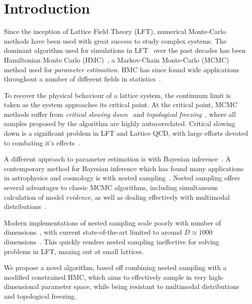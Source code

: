 \documentclass[11pt]{article}
\begin{document}
    \section{Introduction}\label{Introduction}
    Since the inception of Lattice Field Theory (LFT), numerical Monte-Carlo methods have been used with great success to
    study complex systems.
    The dominant algorithm used for simulations in LFT~\cite{borsanyi2021leading} over the past decades has been
    Hamiltonian Monte Carlo
    (HMC)~\cite{HMC_Duane}, a Markov-Chain Monte-Carlo (MCMC) method used for \emph{parameter estimation}.
    HMC has since found wide applications throughout a number of different fields in
    statistics~\cite{girolami2011riemann, kramer2014hamiltonian}.

    To recover the physical behaviour of a lattice system, the continuum limit is taken as the system approaches its
    critical point.
    At the critical point, MCMC methods suffer from \emph{critical slowing down}~\cite{CriticalSlowingWOLFF} and
    \emph{topological freezing}~\cite{Hasenbusch_2018}, where all samples proposed by the algorithm are highly
    autocorrelated.
    Critical slowing down is a significant problem in LFT and Lattice QCD, with large efforts devoted to combating
    it's effects~\cite{Pawlowski_2020,Jansen_MLMC_2020,Albergo_Flow_LFT_2019, Hackett:2021idh,Abbott:2022hkm,Albergo:2022qfi,gao2017efficient}.

    A different approach to parameter estimation is with Bayesian inference~\cite{van2021bayesian}.
    A contemporary method for Bayesian inference which has found many applications in astrophysics and cosmology
    is with nested sampling~\cite{Skilling2006,Handley_polychord}.
    Nested sampling offers several advantages to classic MCMC algorithms, including simultaneous calculation of model
    \emph{evidence}, as well as dealing effectively with multimodal distributions~\cite{Skilling2006}.

    Modern implementations of nested sampling scale poorly with number of dimensions~\cite{Feroz_2009, Handley_2015},
    with current state-of-the-art limited to around $D \approx 1000$ dimensions~\cite{NS_Review_2022}.
    This quickly renders nested sampling ineffective for solving problems in LFT, maxing out at small lattices.

    We propose a novel algorithm, based off combining nested sampling with a modified constrained HMC, which aims
    to effectively sample in very high-dimensional parameter space, while being resistant to multimodal distributions
    and topological freezing.
\end{document}
